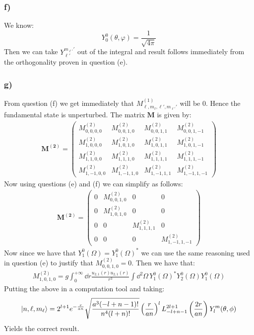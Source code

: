 \documentclass[10pt,a4paper]{book}
\begin{document}
\subsubsection*{f)}
We know:
\[
Y_0^0(\theta, \varphi) = \frac{1}{\sqrt{4 \pi}}
\]
Then we can take $Y_{\ell'}^{m_{\ell'}'}$ out of the integral and result follows immediately from the orthogonality proven in question (e).


\subsubsection*{g)}
From question (f) we get immediately that $M^{(1)}_{\ell, m_\ell, \ell', m_{\ell'}'}$ will be 0. Hence the fundamental state is unperturbed. The matrix $\mathbf{M}$ is given by:
\begin{align*}
\mathbf{M^{(2)}} = 
\begin{pmatrix}
M^{(2)}_{0, 0, 0, 0} & M^{(2)}_{0, 0, 1, 0} & M^{(2)}_{0, 0, 1, 1} & M^{(2)}_{0, 0, 1, -1}\\
M^{(2)}_{1, 0, 0, 0} & M^{(2)}_{1, 0, 1, 0} & M^{(2)}_{1, 0, 1, 1} & M^{(2)}_{1, 0, 1, -1} \\
M^{(2)}_{1, 1, 0, 0} & M^{(2)}_{1, 1, 1, 0} & M^{(2)}_{1, 1, 1, 1} & M^{(2)}_{1, 1, 1, -1} \\
M^{(2)}_{1, -1, 0, 0} & M^{(2)}_{1, -1, 1, 0} & M^{(2)}_{1, -1, 1, 1} & M^{(2)}_{1, -1, 1, -1}
\end{pmatrix}
\end{align*}
Now using questions (e) and (f) we can simplify as follows:
\begin{align*}
\mathbf{M^{(2)}} = 
\begin{pmatrix}
0 & M^{(2)}_{0, 0, 1, 0} & 0 & 0\\
0 & M^{(2)}_{1, 0, 1, 0} & 0 & 0 \\
0 & 0 & M^{(2)}_{1, 1, 1, 1} & 0 \\
0 & 0 & 0 & M^{(2)}_{1, -1, 1, -1}
\end{pmatrix}
\end{align*}
Now since we have that $Y_{1}^{0}(\Omega) = Y_{1}^0 (\Omega)^*$ we can use the same reasoning used in question (e) to justify that $M^{(2)}_{0,0,1,0} = 0$. Then we have that:
\begin{align*}
M_{1,0,1,0}^{(2)} = g\int_0^{+\infty} \dd r \frac{u_{2, 1}(r) u_{2, 1}(r)}{r^3} \int \dd^2 \Omega \, Y_1^{0} (\Omega)^* Y_2^0 (\Omega) Y_{1}^{0} (\Omega)
\end{align*}
Putting the above in a computation tool and taking:
\[
\ket{n, \ell, m_\ell} = 2^{l+1} e^{-\frac{r}{a n}} \sqrt{\frac{a^3 (-l+n-1)!}{n^4 (l+n)!}} \left(\frac{r}{a
   n}\right)^l L_{-l+n-1}^{2 l+1}\left(\frac{2 r}{a n}\right) Y_l^m(\theta ,\phi )
\]
Yields the correct result.
\end{document}
